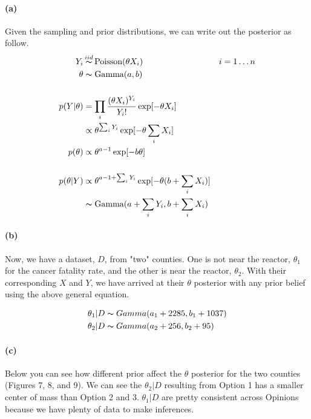 \documentclass[11pt, letterpaper]{article}
\begin{document}
\paragraph{(a)}
Given the sampling and prior distributions, we can write out the posterior as follow.
\begin{align*}
    Y_i &\mathop{\thicksim}^{iid} \text{Poisson}(\theta X_i) && i = 1 \dots n \\
    \theta &\thicksim \text{Gamma}(a, b) \\ \\
    p(Y|\theta) &= \prod_i \frac{(\theta X_i)^{Y_i}}{Y_i !} \exp[-\theta X_i] \\
        &\propto \theta^{\sum_i Y_i} \exp[-\theta \sum_i X_i] \\
    p(\theta) &\propto \theta^{a-1} \exp[-b\theta] \\ \\
    p(\theta|Y) &\propto \theta^{a - 1 + \sum_i Y_i} \exp[-\theta(b+\sum_i X_i)] \\
        &\thicksim \text{Gamma}(a + \sum_i Y_i, b+\sum_i X_i)
\end{align*}

\paragraph{(b)}
Now, we have a dataset, $D$, from "two" counties. One is not near the reactor, $\theta_1$ for the cancer fatality rate, and the other is near the reactor, $\theta_2$. With their corresponding $X$ and $Y$, we have arrived at their $\theta$ posterior with any prior belief using the above general equation.

\begin{align*}
    \theta_1|D &\thicksim Gamma(a_1 + 2285, b_1 + 1037) \\
    \theta_2|D &\thicksim Gamma(a_2 + 256, b_2 + 95)
\end{align*}

\paragraph{(c)}
Below you can see how different prior affect the $\theta$ posterior for the two counties (Figures 7, 8, and 9).
We can see the $\theta_2|D$ resulting from Option 1 has a smaller center of mass than Option 2 and 3. $\theta_1|D$ are pretty consistent across Opinions because we have plenty of data to make inferences.
\end{document}
